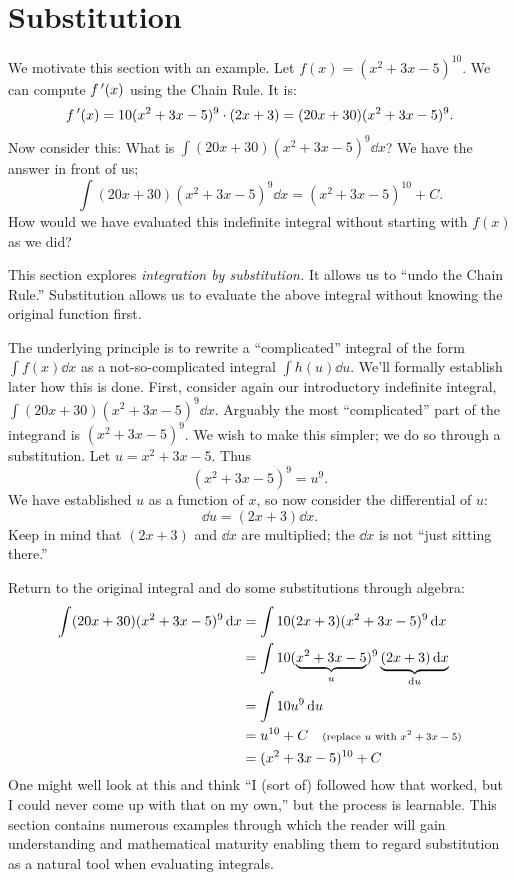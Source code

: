 \section{Substitution}\label{sec:substitution}

We motivate this section with an example. Let $f(x) = (x^2+3x-5)^{10}$. We can compute $f\,'(x)$ using the Chain Rule. It is:
\[f\,'(x) = 10(x^2+3x-5)^9\cdot(2x+3) = (20x+30)(x^2+3x-5)^9.\]
Now consider this: What is $\int (20x+30)(x^2+3x-5)^9\dd x$? We have the answer in front of us;
\[\int (20x+30)(x^2+3x-5)^9\dd x = (x^2+3x-5)^{10}+C.\]
How would we have evaluated this indefinite integral without starting with $f(x)$ as we did?

This section explores \emph{integration by substitution.} It allows us to ``undo the Chain Rule.'' Substitution allows us to evaluate the above integral without knowing the original function first.

The underlying principle is to rewrite a ``complicated'' integral of the form $\int f(x)\dd x$ as a not-so-complicated integral $\int h(u)\dd u$. We'll formally establish later how this is done. First, consider again our introductory indefinite integral, $\int (20x+30)(x^2+3x-5)^9\dd x$. Arguably the most ``complicated'' part of the integrand is $(x^2+3x-5)^9$. We wish to make this simpler; we do so through a substitution. Let $u=x^2+3x-5$. Thus
\[(x^2+3x-5)^9 = u^9.\]
We have established $u$ as a function of $x$, so now consider the differential of $u$:
\[\dd u = (2x+3)\dd x.\]
Keep in mind that $(2x+3)$ and $\dd x$ are multiplied; the $\dd x$ is not ``just sitting there.''

Return to the original integral and do some substitutions through algebra:
\begin{align*}
	\int (20x+30)(x^2+3x-5)^9\operatorname{d}\! x
	&=	\int 10(2x+3)(x^2+3x-5)^9\operatorname{d}\! x \\
	&=\int 10(\underbrace{x^2+3x-5}_u)^9\underbrace{(2x+3)\operatorname{d}\! x}_{\operatorname{d}\! u} \\
	&=\int 10u^9\operatorname{d}\! u \\
	&= u^{10} + C \quad \text{\scriptsize (replace $u$ with $x^2+3x-5$)}\\
	&= (x^2+3x-5)^{10} +C
\end{align*}
One might well look at this and think ``I (sort of) followed how that worked, but I could never come up with that on my own,'' but the process is learnable. This section contains numerous examples through which the reader will gain understanding and mathematical maturity enabling them to regard substitution as a natural tool when evaluating integrals.

